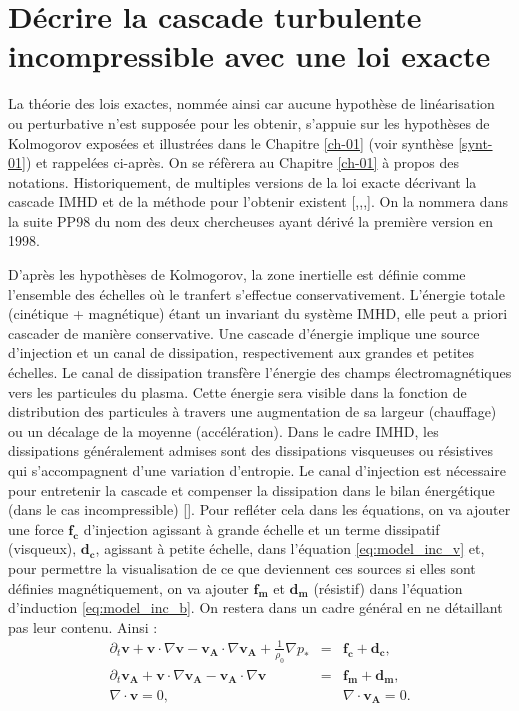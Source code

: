 \section{Décrire la cascade turbulente incompressible avec une loi exacte}
\label{sec-113}
La théorie des lois exactes, nommée ainsi car aucune hypothèse de linéarisation ou perturbative n'est supposée pour les obtenir, s'appuie sur les hypothèses de Kolmogorov exposées et illustrées dans le Chapitre \ref{ch-01} (voir synthèse \ref{synt-01}) et rappelées ci-après. On se réfèrera au Chapitre \ref{ch-01} à propos des notations. Historiquement, de multiples versions de la loi exacte décrivant la cascade \acs{IMHD} et de la méthode pour l'obtenir existent [\cite{politano_von_1998},\cite{politano_dynamical_1998},\cite{macbride_turbulent_2008},\cite{galtier_origin_2018}]. On la nommera dans la suite \acs{PP98} du nom des deux chercheuses ayant dérivé la première version en 1998.

D'après les hypothèses de Kolmogorov, la zone inertielle est définie comme l'ensemble des échelles où le tranfert s'effectue conservativement. L'énergie totale (cinétique + magnétique) étant un invariant du système \acs{IMHD}, elle peut a priori cascader de manière conservative. 
Une cascade d'énergie implique une source d'injection et un canal de dissipation, respectivement aux grandes et petites échelles. Le canal de dissipation transfère l'énergie des champs électromagnétiques vers les particules du plasma. Cette énergie sera visible dans la fonction de distribution des particules à travers une augmentation de sa largeur (chauffage) ou un décalage de la moyenne (accélération). Dans le cadre \acs{IMHD}, les dissipations généralement admises sont des dissipations visqueuses ou résistives qui s'accompagnent d'une variation d'entropie. 
Le canal d'injection est nécessaire pour entretenir la cascade et compenser la dissipation dans le bilan énergétique (dans le cas incompressible) [\cite{galtier_physique_2021}]. Pour refléter cela dans les équations, on va ajouter une force $\boldsymbol{f_c}$ d'injection agissant à grande échelle et un terme dissipatif (visqueux), $\boldsymbol{d_c}$, agissant à petite échelle, dans l'équation \eqref{eq:model_inc_v} et, pour permettre la visualisation de ce que deviennent ces sources si elles sont définies magnétiquement, on va ajouter $\boldsymbol{f_m}$ et $\boldsymbol{d_m}$ (résistif) dans l'équation d'induction \eqref{eq:model_inc_b}. On restera dans un cadre général en ne détaillant pas leur contenu. Ainsi :
\begin{eqnarray}
\label{eq:turb_inc_v} \partial_t \boldsymbol{v} + \boldsymbol{v} \cdot \nabla \boldsymbol{v} -  \boldsymbol{v_A} \cdot \nabla \boldsymbol{v_A} + \frac{1}{\rho_0} \nabla p_* &=&  \boldsymbol{f_c} + \boldsymbol{d_c} , \\
\label{eq:turb_inc_b}  \partial_t \boldsymbol{v_A} + \boldsymbol{v} \cdot \nabla \boldsymbol{v_A} -  \boldsymbol{v_A} \cdot \nabla \boldsymbol{v}&=& \boldsymbol{f_m} + \boldsymbol{d_m} ,\\
\label{eq:turb_inc_r}  \nabla \cdot \boldsymbol{v} = 0, && \nabla \cdot \boldsymbol{v_A} = 0.
\end{eqnarray}

